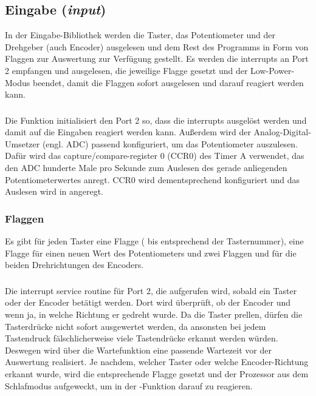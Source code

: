 \subsection{Eingabe (\emph{input})}
In der Eingabe-Bibliothek werden die Taster, das Potentiometer und der Drehgeber (auch Encoder) ausgelesen und dem Rest des Programms in Form von Flaggen zur Auswertung zur Verfügung gestellt. Es werden die interrupts an Port 2 empfangen und ausgelesen, die jeweilige Flagge gesetzt und der Low-Power-Modus beendet, damit die Flaggen sofort ausgelesen und darauf reagiert werden kann.

\subsubsection{}
Die Funktion initialisiert den Port 2 so, dass die interrupts ausgelöst werden und damit auf die Eingaben reagiert werden kann. Außerdem wird der Analog-Digital-Umsetzer (engl. ADC) passend konfiguriert, um das Potentiometer auszulesen. Dafür wird das capture/compare-register 0 (CCR0) des Timer A verwendet, das den ADC hunderte Male pro Sekunde zum Auslesen des gerade anliegenden Potentiometerwertes anregt. CCR0 wird dementsprechend konfiguriert und das Auslesen wird in  angeregt.

\subsubsection{Flaggen}
Es gibt für jeden Taster eine Flagge ( bis  entsprechend der Tasternummer), eine Flagge  für einen neuen Wert des Potentiometers und zwei Flaggen  und  für die beiden Drehrichtungen des Encoders.

\subsubsection{}
Die interrupt service routine für Port 2, die aufgerufen wird, sobald ein Taster oder der Encoder betätigt werden. Dort wird überprüft, ob der Encoder und wenn ja, in welche Richtung er gedreht wurde. Da die Taster prellen, dürfen die Tasterdrücke nicht sofort ausgewertet werden, da ansonsten bei jedem Tastendruck fälschlicherweise viele Tastendrücke erkannt werden würden. Deswegen wird über die Wartefunktion  eine passende Wartezeit vor der Auswertung realisiert. Je nachdem, welcher Taster oder welche Encoder-Richtung erkannt wurde, wird die entsprechende Flagge gesetzt und der Prozessor aus dem Schlafmodus aufgeweckt, um in der -Funktion darauf zu reagieren.

